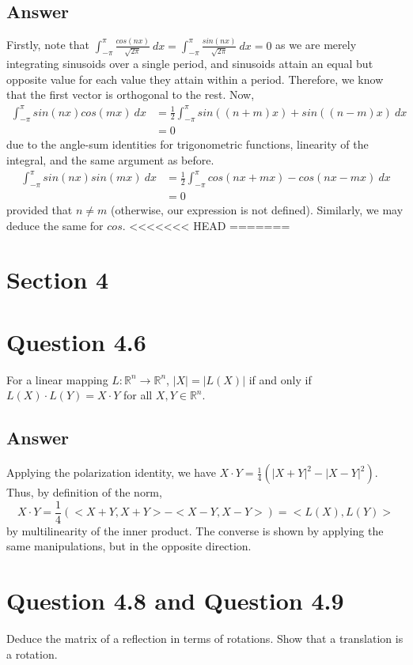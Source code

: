 \documentclass[
	12pt, %
]{fphw}
\begin{document}
\subsection*{Answer}
Firstly, note that $\int_{-\pi}^{\pi}\frac{cos(nx)}{\sqrt{2\pi}}  \ dx = \int_{-\pi}^{\pi}\frac{sin(nx)}{\sqrt{2\pi}} \ dx = 0 $ as we are merely integrating sinusoids over a single period, and sinusoids attain an equal but opposite value for each value they attain within a period. Therefore, we know that the first vector is orthogonal to the rest. 
Now, 
\begin{align}
	\int_{-\pi}^{\pi}sin(nx)cos(mx) \ dx & = \frac{1}{2}\int_{-\pi}^{\pi}sin((n+m)x)+sin((n-m)x) \ dx \\ 
&=0 
\end{align}
due to the angle-sum identities for trigonometric functions, linearity of the integral,  and the same argument as before.
\begin{align}
\int_{-\pi}^{\pi}sin(nx)sin(mx) \ dx &= \frac{1}{2}\int_{-\pi}^{\pi}cos(nx+mx)-cos(nx-mx) \ dx	\\
&= 0  
\end{align}
provided that $n\neq m$ (otherwise, our expression is not defined). Similarly, we may deduce the same for $cos$.
<<<<<<< HEAD
=======
\section*{Section 4}
\section*{Question 4.6}
\begin{problem}
	For a linear mapping $L:\mathbb{R}^n \to \mathbb{R}^n$, $|X|=|L(X)|$ if and only if 
	$L(X) \cdot L(Y) = X \cdot Y$ for all $X,Y \in \mathbb{R}^n$.

	
\end{problem}
\subsection*{Answer}
Applying the polarization identity, we have $X \cdot Y=\frac{1}{4}(|X+Y|^2-|X-Y|^2)$. Thus, by definition of the norm, $$X \cdot Y=\frac{1}{4}(<X+Y,X+Y>-<X-Y,X-Y>)=<L(X),L(Y)>$$ by multilinearity of the inner product. The converse is shown by applying the same manipulations, but in the opposite direction.
\section*{Question 4.8 and Question 4.9}
\begin{problem}
	Deduce the matrix of a reflection in terms of rotations. Show that a translation is a rotation.
	
\end{problem}
\end{document}
